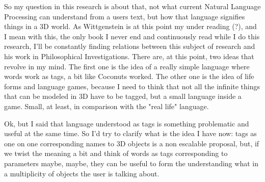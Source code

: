 \documentclass[12pt]{article}
\begin{document}
So my question in this research is about that, not what current Natural Language Processing can understand from a users text, but how that language signifies things in a 3D world.
As Wittgenstein is at this point my under reading (?), and I mean with this, the only book I never end and continuously read while I do this research, I'll be constantly finding relations between this 
subject of research and his work in Philosophical Investigations. 
There are, at this point, two ideas that revolve in my mind. The first one is the idea of a really simple language where words work as tags, a bit like Coconuts worked. 
The other one is the idea of life forms and language games, because I need to think that not all the infinite things that can be modeled in 3D have to be tagged, but a small language inside a game.
Small, at least, in comparison with the "real life" language.

Ok, but I said that language understood as tags is something problematic and useful at the same time. So I'd try to clarify what is the idea I have now: tags as one on one corresponding names to 3D 
objects is a non escalable proposal, but, if we twist the meaning a bit and think of words as tags corresponding to parameters maybe, maybe, they can be useful to form the understanding what in a multiplicity 
of objects the user is talking about.
\end{document}
